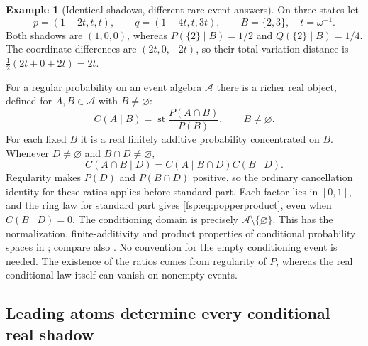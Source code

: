 \documentclass[11pt,a4paper]{article}
\numberwithin{equation}{section}
\theoremstyle{definition}
\newtheorem{example}[theorem]{Example}
\theoremstyle{remark}
\newcommand{\A}{\mathcal A}
\newcommand{\st}{\operatorname{st}}
\begin{document}
\begin{example}[Identical shadows, different rare-event answers]
\label{fsp:ex:shadowloss}
On three states let
\begin{equation}
 p=(1-2t,t,t),\qquad q=(1-4t,t,3t),\qquad B=\{2,3\},
 \quad t=\omega^{-1}.
\end{equation}
Both shadows are $(1,0,0)$, whereas
$P(\{2\}\mid B)=1/2$ and $Q(\{2\}\mid B)=1/4$.
The coordinate differences are $(2t,0,-2t)$, so their total variation
distance is $\tfrac12(2t+0+2t)=2t$.
\end{example}

For a regular probability on an event algebra $\A$ there is a richer
real object, defined for $A,B\in\A$ with $B\ne\varnothing$:
\begin{equation}\label{fsp:eq:conditionalshadow}
 C(A\mid B)=\st\frac{P(A\cap B)}{P(B)},\qquad B\ne\varnothing.
\end{equation}
For each fixed $B$ it is a real finitely additive probability concentrated
on $B$. Whenever $D\ne\varnothing$ and $B\cap D\ne\varnothing$,
\begin{equation}\label{fsp:eq:popperproduct}
 C(A\cap B\mid D)=C(A\mid B\cap D)C(B\mid D).
\end{equation}
Regularity makes $P(D)$ and $P(B\cap D)$ positive, so the ordinary
cancellation identity for these ratios applies before standard part.
Each factor lies in $[0,1]$, and the ring law for standard part gives
\eqref{fsp:eq:popperproduct}, even when $C(B\mid D)=0$.
The conditioning domain is precisely $\A\setminus\{\varnothing\}$.
This has the normalization, finite-additivity and product properties of
conditional probability spaces in \cite[Definition~2.1]{halpern}; compare
also \cite{brickhill}. No convention for the empty conditioning event is
needed. The existence of the ratios comes from regularity of $P$, whereas
the real conditional law itself can vanish on nonempty events.

\subsection{Leading atoms determine every conditional real shadow}
\end{document}
